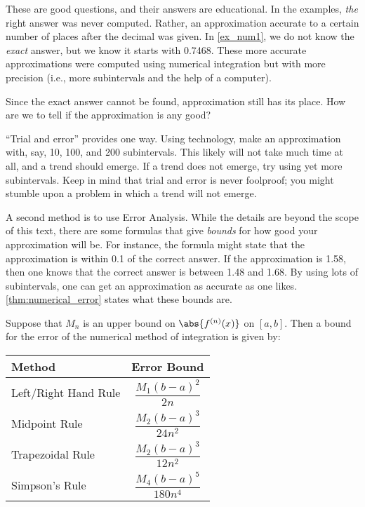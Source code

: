 These are good questions, and their answers are educational. In the examples, \textit{the} right answer was never computed. Rather, an approximation accurate to a certain number of places after the decimal was given. In \autoref{ex_num1}, we do not know the \textit{exact} answer, but we know it starts with 0.7468. These more accurate approximations were computed using numerical integration but with more precision (i.e., more subintervals and the help of a computer). 

Since the exact answer cannot be found, approximation still has its place. How are we to tell if the approximation is any good?

``Trial and error'' provides one way. %
Using technology, make an approximation with, say, 10, 100, and 200 subintervals. This likely will not take much time at all, and a trend should emerge. If a trend does not emerge, try using yet more subintervals. Keep in mind that trial and error is never foolproof; you might stumble upon a problem in which a trend will not emerge.

A second method is to use Error Analysis. While the details are beyond the scope of this text, there are some formulas that give \textit{bounds} for how good your approximation will be. For instance, the formula might state that the approximation is within 0.1 of the correct answer. If the approximation is 1.58, then one knows that the correct answer is between 1.48 and 1.68. By using lots of subintervals, one can get an approximation as accurate as one likes. \autoref{thm:numerical_error} states what these bounds are.

\begin{theorem}\label{thm:numerical_error}
Suppose that $M_n$ is an upper bound on $\abs{f^{(n)}(x)}$ on $[a,b]$.  Then a bound for the error of the numerical method of integration is given by:
\begin{center}
\begin{tabular}{lc}
Method & Error Bound \\\midrule
Left/Right Hand Rule & $\dfrac{M_1(b-a)^2}{2n}$ \\
Midpoint Rule & $\dfrac{M_2(b-a)^3}{24n^2}$ \\
Trapezoidal Rule & $\dfrac{M_2(b-a)^3}{12n^2}$ \\
Simpson's Rule & $\dfrac{M_4(b-a)^5}{180n^4}$
\end{tabular}
\end{center}
\end{theorem}

